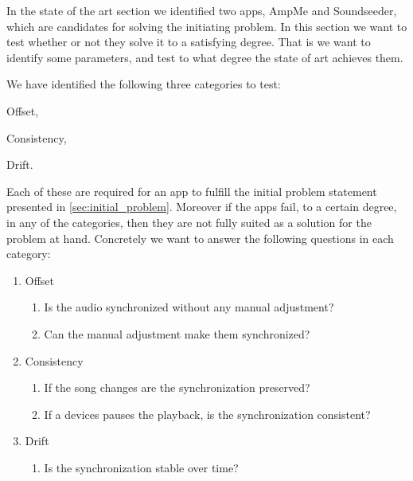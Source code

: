 In the state of the art section we identified two apps, AmpMe and Soundseeder, which are candidates for solving the initiating problem. 
In this section we want to test whether or not they solve it to a satisfying degree. 
That is we want to identify some parameters, and test to what degree the state of art achieves them.

We have identified the following three categories to test:
\begin{enumerate*}[label=(\alph*)]
    \item Offset,
    \item Consistency,
    \item Drift.
\end{enumerate*}

Each of these are required for an app to fulfill the initial problem statement presented in \vref{sec:initial_problem}.
Moreover if the apps fail, to a certain degree, in any of the categories, then they are not fully suited as a solution for the problem at hand. 
Concretely we want to answer the following questions in each category:
\begin{enumerate}[label=(\alph*)]
    \item Offset
    \begin{enumerate}[label=(\arabic*)]
        \item Is the audio synchronized without any manual adjustment?
        \item Can the manual adjustment make them synchronized?
    \end{enumerate} 
    \item Consistency
    \begin{enumerate}[start=3,label=(\arabic*)]
        \item If the song changes are the synchronization preserved?
        \item If a devices pauses the playback, is the synchronization consistent?
    \end{enumerate}
    \item Drift
    \begin{enumerate}[start=6,label=(\arabic*)]
        \item Is the synchronization stable over time?
    \end{enumerate}
\end{enumerate}
